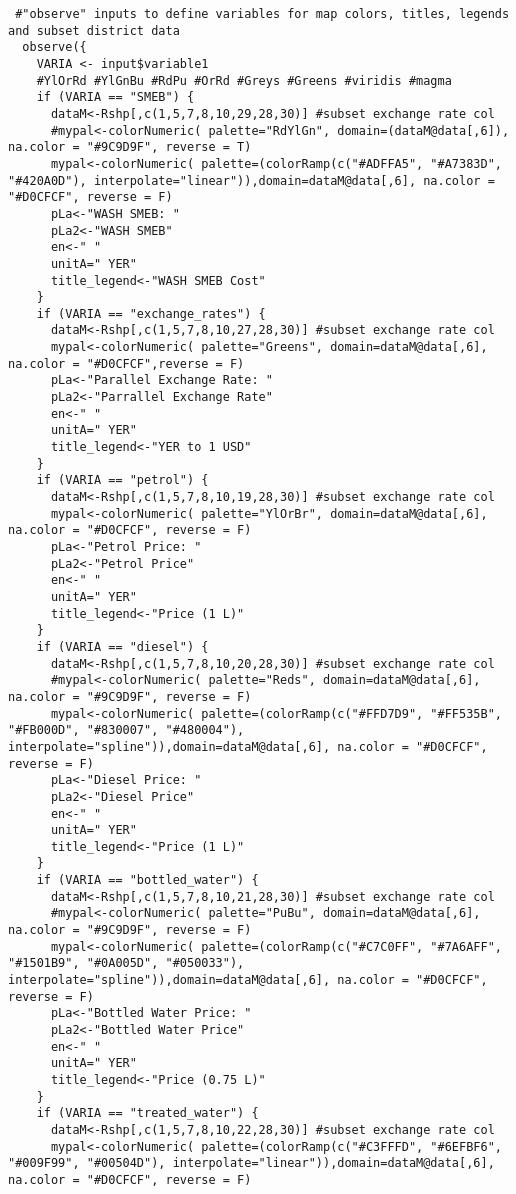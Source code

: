 \documentclass[
]{article}
\begin{document}
\begin{verbatim}
 #"observe" inputs to define variables for map colors, titles, legends and subset district data
  observe({
    VARIA <- input$variable1
    #YlOrRd #YlGnBu #RdPu #OrRd #Greys #Greens #viridis #magma
    if (VARIA == "SMEB") {
      dataM<-Rshp[,c(1,5,7,8,10,29,28,30)] #subset exchange rate col
      #mypal<-colorNumeric( palette="RdYlGn", domain=(dataM@data[,6]), na.color = "#9C9D9F", reverse = T)
      mypal<-colorNumeric( palette=(colorRamp(c("#ADFFA5", "#A7383D", "#420A0D"), interpolate="linear")),domain=dataM@data[,6], na.color = "#D0CFCF", reverse = F)
      pLa<-"WASH SMEB: "
      pLa2<-"WASH SMEB"
      en<-" "
      unitA=" YER"
      title_legend<-"WASH SMEB Cost"
    }
    if (VARIA == "exchange_rates") {
      dataM<-Rshp[,c(1,5,7,8,10,27,28,30)] #subset exchange rate col
      mypal<-colorNumeric( palette="Greens", domain=dataM@data[,6], na.color = "#D0CFCF",reverse = F)
      pLa<-"Parallel Exchange Rate: "
      pLa2<-"Parrallel Exchange Rate"
      en<-" "
      unitA=" YER"
      title_legend<-"YER to 1 USD"
    }
    if (VARIA == "petrol") {
      dataM<-Rshp[,c(1,5,7,8,10,19,28,30)] #subset exchange rate col
      mypal<-colorNumeric( palette="YlOrBr", domain=dataM@data[,6], na.color = "#D0CFCF", reverse = F)
      pLa<-"Petrol Price: "
      pLa2<-"Petrol Price"
      en<-" "
      unitA=" YER"
      title_legend<-"Price (1 L)"
    }
    if (VARIA == "diesel") {
      dataM<-Rshp[,c(1,5,7,8,10,20,28,30)] #subset exchange rate col
      #mypal<-colorNumeric( palette="Reds", domain=dataM@data[,6], na.color = "#9C9D9F", reverse = F)
      mypal<-colorNumeric( palette=(colorRamp(c("#FFD7D9", "#FF535B", "#FB000D", "#830007", "#480004"), interpolate="spline")),domain=dataM@data[,6], na.color = "#D0CFCF", reverse = F)
      pLa<-"Diesel Price: "
      pLa2<-"Diesel Price"
      en<-" "
      unitA=" YER"
      title_legend<-"Price (1 L)"
    }
    if (VARIA == "bottled_water") {
      dataM<-Rshp[,c(1,5,7,8,10,21,28,30)] #subset exchange rate col
      #mypal<-colorNumeric( palette="PuBu", domain=dataM@data[,6], na.color = "#9C9D9F", reverse = F)
      mypal<-colorNumeric( palette=(colorRamp(c("#C7C0FF", "#7A6AFF", "#1501B9", "#0A005D", "#050033"), interpolate="spline")),domain=dataM@data[,6], na.color = "#D0CFCF", reverse = F)
      pLa<-"Bottled Water Price: "
      pLa2<-"Bottled Water Price"
      en<-" "
      unitA=" YER"
      title_legend<-"Price (0.75 L)"
    }
    if (VARIA == "treated_water") {
      dataM<-Rshp[,c(1,5,7,8,10,22,28,30)] #subset exchange rate col
      mypal<-colorNumeric( palette=(colorRamp(c("#C3FFFD", "#6EFBF6", "#009F99", "#00504D"), interpolate="linear")),domain=dataM@data[,6], na.color = "#D0CFCF", reverse = F)

\end{verbatim}
\end{document}
